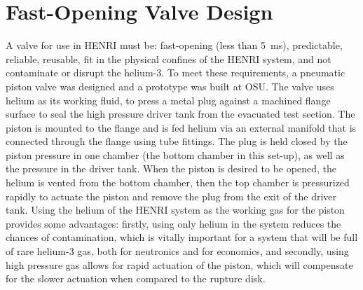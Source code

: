 \section{Fast-Opening Valve Design} \label{s:design}
A valve for use in HENRI must be: fast-opening (less than \SI{5}{\milli\second}), predictable, reliable, reusable, fit in the physical confines of the HENRI system, and not contaminate or disrupt the helium-3. 
To meet these requirements, a pneumatic piston valve was designed and a prototype was built at OSU. The valve uses helium as its working fluid, to press a metal plug against a machined flange surface to seal the high pressure driver tank from the evacuated test section. The piston is mounted to the flange and is fed helium via an external manifold that is connected through the flange using tube fittings. The plug is held closed by the piston pressure in one chamber (the bottom chamber in this set-up), as well as the pressure in the driver tank. When the piston is desired to be opened, the helium is vented from the bottom chamber, then the top chamber is pressurized rapidly to actuate the piston and remove the plug from the exit of the driver tank. Using the helium of the HENRI system as the working gas for the piston provides some advantages: firstly, using only helium in the system reduces the chances of contamination, which is vitally important for a system that will be full of rare helium-3 gas, both for neutronics and for economics, and secondly, using high pressure gas allows for rapid actuation of the piston, which will compensate for the slower actuation when compared to the rupture disk.



